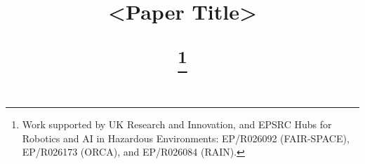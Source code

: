 
\title{
<Paper Title>

\thanks{Work supported by UK Research and Innovation, and EPSRC Hubs for Robotics and AI in Hazardous Environments: EP/R026092 (FAIR-SPACE), EP/R026173 (ORCA), and EP/R026084 (RAIN).}
    
}
    